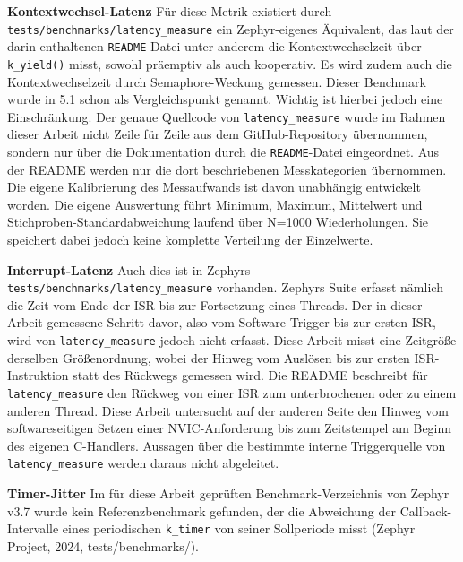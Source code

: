 \textbf{Kontextwechsel-Latenz }F{\"u}r diese Metrik existiert durch \lstinline[style=fileinline]|tests/benchmarks/latency_measure| ein Zephyr-eigenes {\"A}quivalent, das laut der darin enthaltenen \lstinline[style=fileinline]|README|-Datei unter anderem die Kontextwechselzeit {\"u}ber \lstinline[style=fileinline]|k_yield()| misst, sowohl pr{\"a}emptiv als auch kooperativ. Es wird zudem auch die Kontextwechselzeit durch Semaphore-Weckung gemessen. Dieser Benchmark wurde in 5.1 schon als Vergleichspunkt genannt. Wichtig ist hierbei jedoch eine Einschr{\"a}nkung. Der genaue Quellcode von \lstinline[style=fileinline]|latency_measure| wurde im Rahmen dieser Arbeit nicht Zeile f{\"u}r Zeile aus dem GitHub-Repository {\"u}bernommen, sondern nur {\"u}ber die Dokumentation durch die \lstinline[style=fileinline]|README|-Datei eingeordnet. Aus der README werden nur die dort beschriebenen Messkategorien {\"u}bernommen. Die eigene Kalibrierung des Messaufwands ist davon unabh{\"a}ngig entwickelt worden. Die eigene Auswertung f{\"u}hrt Minimum, Maximum, Mittelwert und Stichproben-Standardabweichung laufend {\"u}ber N=1000 Wiederholungen. Sie speichert dabei jedoch keine komplette Verteilung der Einzelwerte.

\textbf{Interrupt-Latenz }Auch dies ist in Zephyrs \lstinline[style=fileinline]|tests/benchmarks/latency_measure| vorhanden. Zephyrs Suite erfasst n{\"a}mlich die Zeit vom Ende der ISR bis zur Fortsetzung eines Threads. Der in dieser Arbeit gemessene Schritt davor, also vom Software-Trigger bis zur ersten ISR, wird von \lstinline[style=fileinline]|latency_measure| jedoch nicht erfasst. Diese Arbeit misst eine Zeitgr{\"o}{\ss}e derselben Gr{\"o}{\ss}enordnung, wobei der Hinweg vom Ausl{\"o}sen bis zur ersten ISR-Instruktion statt des R{\"u}ckwegs gemessen wird. Die README beschreibt f{\"u}r \lstinline[style=fileinline]|latency_measure| den R{\"u}ckweg von einer ISR zum unterbrochenen oder zu einem anderen Thread. Diese Arbeit untersucht auf der anderen Seite den Hinweg vom softwareseitigen Setzen einer NVIC-Anforderung bis zum Zeitstempel am Beginn des eigenen C-Handlers. Aussagen {\"u}ber die bestimmte interne Triggerquelle von \lstinline[style=fileinline]|latency_measure| werden daraus nicht abgeleitet.

\textbf{Timer-Jitter }Im f{\"u}r diese Arbeit gepr{\"u}ften Benchmark-Verzeichnis von Zephyr v3.7 wurde kein Referenzbenchmark gefunden, der die Abweichung der Callback-Intervalle eines periodischen \lstinline[style=fileinline]|k_timer| von seiner Sollperiode misst (Zephyr Project, 2024, tests/benchmarks/).

